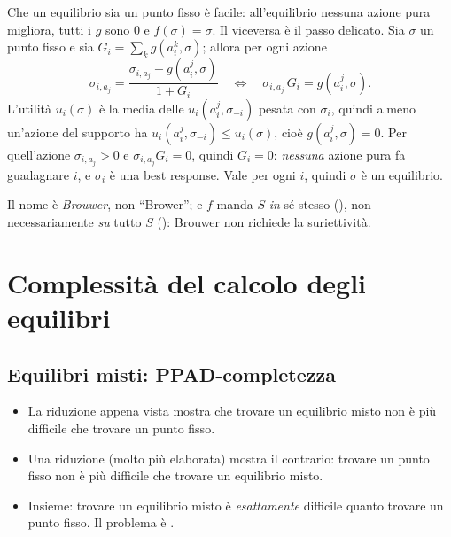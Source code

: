 \begin{extra}
Che un equilibrio sia un punto fisso è facile: all'equilibrio nessuna azione pura migliora,
tutti i $g$ sono 0 e $f(\sigma) = \sigma$. Il viceversa è il passo delicato. Sia $\sigma$
un punto fisso e sia $G_i = \sum_k g(a_i^k, \sigma)$; allora per ogni azione
\[
  \sigma_{i,a_j} = \frac{\sigma_{i,a_j} + g(a_i^j,\sigma)}{1 + G_i}
  \quad\Longleftrightarrow\quad
  \sigma_{i,a_j}\,G_i = g(a_i^j, \sigma).
\]
L'utilità $u_i(\sigma)$ è la media delle $u_i(a_i^j, \sigma_{-i})$ pesata con $\sigma_i$,
quindi almeno un'azione del supporto ha $u_i(a_i^j,\sigma_{-i}) \le u_i(\sigma)$, cioè
$g(a_i^j,\sigma) = 0$. Per quell'azione $\sigma_{i,a_j} > 0$ e $\sigma_{i,a_j} G_i = 0$,
quindi $G_i = 0$: \emph{nessuna} azione pura fa guadagnare $i$, e $\sigma_i$ è una best
response. Vale per ogni $i$, quindi $\sigma$ è un equilibrio.
\end{extra}

\begin{attenzione}[refusi]
Il nome è \emph{Brouwer}, non ``Brower''; e $f$ manda $S$ \emph{in} sé stesso (),
non necessariamente \emph{su} tutto $S$ (): Brouwer non richiede la suriettività.
\end{attenzione}

\section{Complessità del calcolo degli equilibri}

\subsection{Equilibri misti: PPAD-completezza}

\begin{itemize}
  \item La riduzione appena vista mostra che trovare un equilibrio misto non è più difficile
        che trovare un punto fisso.
  \item Una riduzione (molto più elaborata) mostra il contrario: trovare un punto fisso non
        è più difficile che trovare un equilibrio misto.
  \item Insieme: trovare un equilibrio misto è \emph{esattamente} difficile quanto trovare
        un punto fisso. Il problema è .
\end{itemize}

